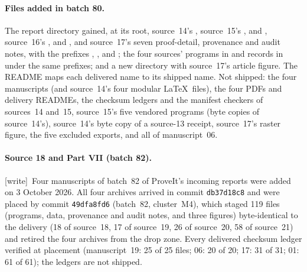 \documentclass[11pt,letterpaper]{article}
\numberwithin{equation}{section}
\theoremstyle{definition}
\theoremstyle{remark}
\newcommand{\wtag}{\textup{[write]}}
\begin{document}
\paragraph{Files added in batch 80.} The report directory gained, at its root, source~14's , source~15's ,  and , source~16's ,  and , and source~17's seven proof-detail, provenance and audit notes, with the prefixes , ,  and ; the four sources' programs in  and records in  under the same prefixes; and a new directory  with source~17's article figure. The README maps each delivered name to its shipped name. Not shipped: the four manuscripts (and source~14's four modular \LaTeX\ files), the four PDFs and delivery READMEs, the checksum ledgers and the manifest checkers of sources~14 and~15, source~15's five vendored programs (byte copies of source~14's), source~14's byte copy of a source-13 receipt, source~17's raster figure, the five excluded exports, and all of manuscript~06.

\paragraph{Source 18 and Part VII (batch 82).} \wtag\ Four manuscripts of batch~82 of ProveIt's incoming reports were added on 3 October 2026. All four archives arrived in commit \texttt{db37d18c8} and were placed by commit \texttt{49dfa8fd6} (batch~82, cluster~M4), which staged 119 files (programs, data, provenance and audit notes, and three figures) byte-identical to the delivery (18 of source~18, 17 of source~19, 26 of source~20, 58 of source~21) and retired the four archives from the drop zone. Every delivered checksum ledger verified at placement (manuscript~19: 25 of 25 files; 06: 20 of 20; 17: 31 of 31; 01: 61 of 61); the ledgers are not shipped.
\end{document}
